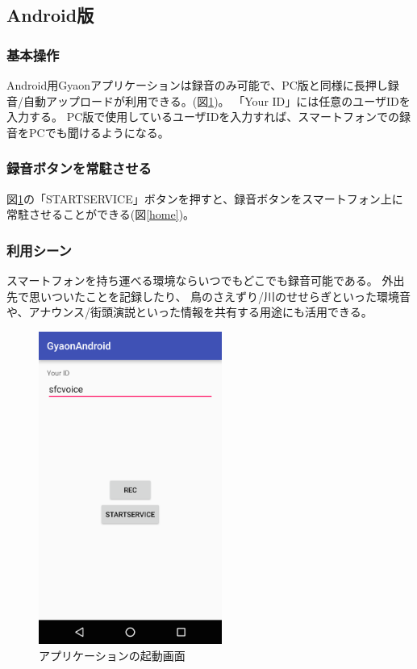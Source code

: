 
\subsection{Android版}

\subsubsection{基本操作}
Android用Gyaonアプリケーションは録音のみ可能で、PC版と同様に長押し録音/自動アップロードが利用できる。(図\ref{app})。
「Your ID」には任意のユーザIDを入力する。
PC版で使用しているユーザIDを入力すれば、スマートフォンでの録音をPCでも聞けるようになる。

\subsubsection{録音ボタンを常駐させる}
図\ref{app}の「STARTSERVICE」ボタンを押すと、録音ボタンをスマートフォン上に常駐させることができる(図\ref{home})。

\subsubsection{利用シーン}
スマートフォンを持ち運べる環境ならいつでもどこでも録音可能である。
外出先で思いついたことを記録したり、
鳥のさえずり/川のせせらぎといった環境音や、アナウンス/街頭演説といった情報を共有する用途にも活用できる。

\begin{figure}[H]
\centering
\includegraphics[width=6cm]{images/app.png}
\caption{アプリケーションの起動画面}
\label{app}
\end{figure}

